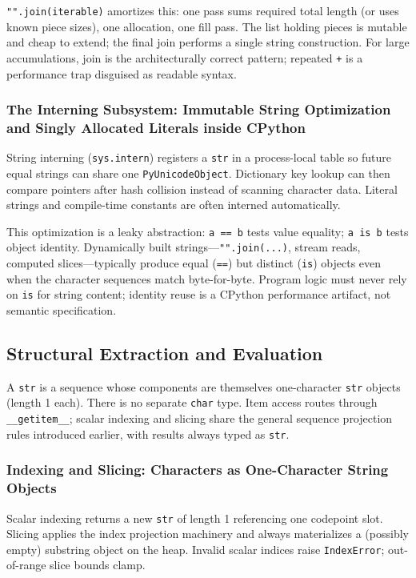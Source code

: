 \documentclass[a4paper,twoside]{report}
\begin{document}
\texttt{"".join(iterable)} amortizes this: one pass sums required total length (or uses known piece sizes), one allocation, one fill pass. The list holding pieces is mutable and cheap to extend; the final join performs a single string construction. For large accumulations, join is the architecturally correct pattern; repeated \texttt{+} is a performance trap disguised as readable syntax.

\subsubsection{The Interning Subsystem: Immutable String Optimization and Singly Allocated Literals inside CPython}

String interning (\texttt{sys.intern}) registers a \texttt{str} in a process-local table so future equal strings can share one \texttt{PyUnicodeObject}. Dictionary key lookup can then compare pointers after hash collision instead of scanning character data. Literal strings and compile-time constants are often interned automatically.

This optimization is a leaky abstraction: \texttt{a == b} tests value equality; \texttt{a is b} tests object identity. Dynamically built strings---\texttt{"".join(...)}, stream reads, computed slices---typically produce equal (\texttt{==}) but distinct (\texttt{is}) objects even when the character sequences match byte-for-byte. Program logic must never rely on \texttt{is} for string content; identity reuse is a CPython performance artifact, not semantic specification.


\subsection{Structural Extraction and Evaluation}

A \texttt{str} is a sequence whose components are themselves one-character \texttt{str} objects (length 1 each). There is no separate \texttt{char} type. Item access routes through \texttt{\_\_getitem\_\_}; scalar indexing and slicing share the general sequence projection rules introduced earlier, with results always typed as \texttt{str}.

\subsubsection{Indexing and Slicing: Characters as One-Character String Objects}

Scalar indexing returns a new \texttt{str} of length 1 referencing one codepoint slot. Slicing applies the index projection machinery and always materializes a (possibly empty) substring object on the heap. Invalid scalar indices raise \texttt{IndexError}; out-of-range slice bounds clamp.
\end{document}
